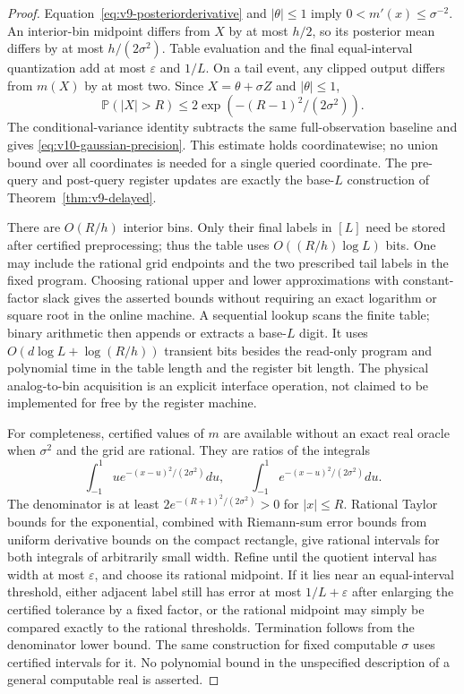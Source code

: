 \begin{proof}
Equation~\eqref{eq:v9-posteriorderivative} and $|\theta|\le1$ imply
$0<m'(x)\le\sigma^{-2}$. An interior-bin midpoint differs from $X$
by at most $h/2$, so its posterior mean differs by at most
$h/(2\sigma^2)$. Table evaluation and the final equal-interval
quantization add at most $\varepsilon$ and $1/L$. On a tail event,
any clipped output differs from $m(X)$ by at most two. Since
$X=\theta+\sigma Z$ and $|\theta|\le1$,
\[
 \mathbb P(|X|>R)\le
 2\exp(-(R-1)^2/(2\sigma^2)).
\]
The conditional-variance identity subtracts the same full-observation
baseline and gives \eqref{eq:v10-gaussian-precision}. This estimate
holds coordinatewise; no union bound over all coordinates is needed
for a single queried coordinate. The pre-query and post-query
register updates are exactly the base-$L$ construction of
Theorem~\ref{thm:v9-delayed}.

There are $O(R/h)$ interior bins. Only their final labels in $[L]$
need be stored after certified preprocessing; thus the table uses
$O((R/h)\log L)$ bits. One may include the rational grid endpoints
and the two prescribed tail labels in the fixed program. Choosing
rational upper and lower approximations with constant-factor slack
gives the asserted bounds without requiring an exact logarithm or
square root in the online machine. A sequential lookup scans the
finite table; binary arithmetic then appends or extracts a base-$L$
digit. It uses $O(d\log L+\log(R/h))$ transient bits besides the
read-only program and polynomial time in the table length and the
register bit length. The physical analog-to-bin acquisition is an
explicit interface operation, not claimed to be implemented for free
by the register machine.

For completeness, certified values of $m$ are available without an
exact real oracle when $\sigma^2$ and the grid are rational. They are
ratios of the integrals
\[
 \int_{-1}^1 u e^{-(x-u)^2/(2\sigma^2)}du,
 \qquad
 \int_{-1}^1 e^{-(x-u)^2/(2\sigma^2)}du.
\]
The denominator is at least
$2e^{-(R+1)^2/(2\sigma^2)}>0$ for $|x|\le R$. Rational Taylor bounds
for the exponential, combined with Riemann-sum error bounds from
uniform derivative bounds on the compact rectangle, give rational
intervals for both integrals of arbitrarily small width. Refine until
the quotient interval has width at most $\varepsilon$, and choose
its rational midpoint. If it lies near an equal-interval threshold,
either adjacent label still has error at most
$1/L+\varepsilon$ after enlarging the certified tolerance by a fixed
factor, or the rational midpoint may simply be compared exactly to
the rational thresholds. Termination follows from the denominator
lower bound. The same construction for fixed computable $\sigma$
uses certified intervals for it. No polynomial bound in the
unspecified description of a general computable real is asserted.
\end{proof}

